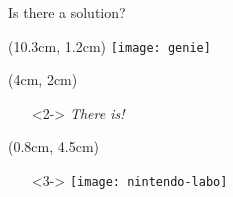 \begin{frame}{Is there a solution?}

  \begin{textblock*}{5cm}(10.3cm, 1.2cm)
    \texttt{[image: genie]}
  \end{textblock*}

  \begin{textblock*}{5cm}(4cm, 2cm)
    \begin{itemize}
     \item[]<2-> \Huge \textit{There is!}
    \end{itemize}
  \end{textblock*}
  
  \begin{textblock*}{5cm}(0.8cm, 4.5cm)
   \begin{itemize}
    \item[]<3-> \texttt{[image: nintendo-labo]}
   \end{itemize}

  \end{textblock*}

  
  
\end{frame}
